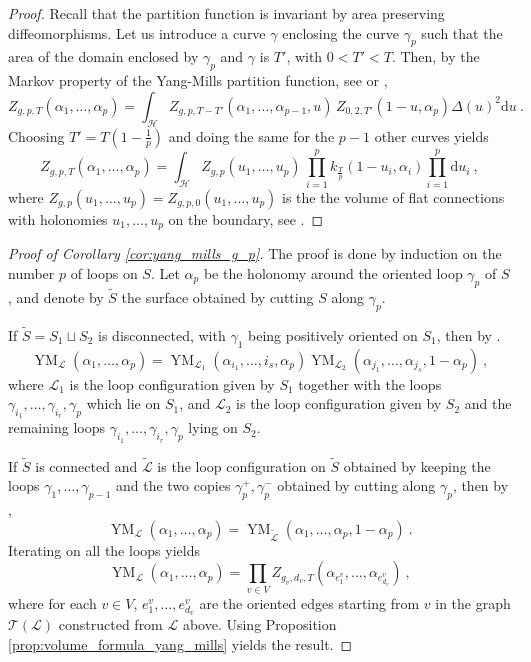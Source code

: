 \documentclass[11pt,a4paper]{amsart}
\providecommand{\diff}{\mathrm d}
\numberwithin{equation}{section}
\theoremstyle{definition}
\begin{document}
\begin{proof}
Recall that the partition function is invariant by area preserving diffeomorphisms. Let us introduce a curve $\gamma$ enclosing the curve $\gamma_p$ such that the area of the domain enclosed by $\gamma_p$ and $\gamma$ is $T'$, with $0< T'< T$. Then, by the Markov property of the Yang-Mills partition function, see \cite[Proposition 5.1.2]{levy2003yang} or \cite[Eq. (2.63)]{witten1992two},
$$Z_{g, p, T}(\alpha_1, \dots, \alpha_p)=\int_{\mathcal{H}} Z_{g, p, T-T'}(\alpha_1, \dots, \alpha_{p-1}, u) \, 
        Z_{0, 2, T'}(1-u, \alpha_p) \Delta(u)^2\diff u \ .$$
Choosing $T'=T(1-\frac{1}{p})$ and doing the same for the $p-1$ other curves yields
$$Z_{g, p, T}(\alpha_1, \dots, \alpha_p)=\int_{\mathcal{H}} Z_{g, p}(u_1, \dots, u_p) \, 
        \prod_{i=1}^pk_{\frac{T}{p}}(1-u_i, \alpha_i)\prod_{i=1}^p \diff u_i \ ,$$
where $Z_{g, p}(u_1, \dots, u_p)=Z_{g, p,0}(u_1, \dots, u_p)$ is the 
the volume of flat connections with holonomies $u_1,\ldots,u_p$ on the boundary, see \cite{sengupta2003volume}. 
\end{proof}
\begin{proof}[Proof of Corollary \ref{cor:yang_mills_g_p}]

The proof is done by induction on the number $p$ of loops on $S$. Let $\alpha_p$ be the holonomy around the oriented loop $\gamma_p$ of $S$, and denote by $\tilde{S}$ the surface obtained by cutting $S$ along $\gamma_p$. 

If $\tilde{S}=S_1\sqcup S_2$ is disconnected, with $\gamma_1$ being positively oriented on $S_1$, then by  \cite[Proposition 5.1.3]{levy2003yang}.
$$\operatorname{YM}_{\mathcal{L}}(\alpha_1,\ldots,\alpha_p)=\operatorname{YM}_{\mathcal{L}_{1}}(\alpha_{i_1},\ldots,{i_s},\alpha_p) 
\operatorname{YM}_{\mathcal{L}_2}(\alpha_{j_1},\ldots,\alpha_{j_s},1-\alpha_p) \ ,$$
where $\mathcal{L}_1$ is the loop configuration given by $S_1$ together with the loops $\gamma_{i_1},\ldots,\gamma_{i_r},\gamma_{p}$ which lie on $S_1$, and $\mathcal{L}_2$ is the loop configuration given by $S_2$ and the remaining loops $\gamma_{i_1},\ldots,\gamma_{i_r},\gamma_{p}$ lying on $S_2$. 

If $\tilde{S}$ is connected and $\tilde{\mathcal{L}}$ is the loop configuration on $\tilde{S}$ obtained by keeping the loops $\gamma_1,\ldots,\gamma_{p-1}$ and the two copies $\gamma_p^+,\gamma_p^-$ obtained by cutting along $\gamma_p$, then by  \cite[Proposition 5.4.3]{levy2003yang},
$$\operatorname{YM}_{\mathcal{L}}(\alpha_1,\ldots,\alpha_p)=\operatorname{YM}_{\tilde{\mathcal{L}}}(\alpha_1,\ldots,\alpha_p,1-\alpha_p) \ .$$
Iterating on all the loops yields 
$$\operatorname{YM}_{\mathcal{L}}(\alpha_1,\ldots,\alpha_p) 
        = 
        \prod_{v\in V}Z_{g_v, d_v,T}(\alpha_{e_1^v}, \dots, \alpha_{e_{d_v}^v}) \ ,$$
        where for each $v\in V$, $e_1^v, \dots, e_{d_v}^v$ are the oriented edges starting from $v$ in the graph $\mathcal{T}(\mathcal{L})$ constructed from $\mathcal{L}$ above. Using Proposition \ref{prop:volume_formula_yang_mills} yields the result.
\end{proof}
% 
% 

\printbibliography
\end{document}
